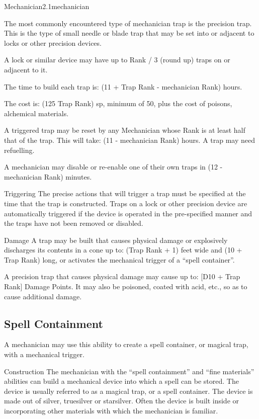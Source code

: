 \begin{skill}{Mechanician}{2.1}{mechanician}
\begin{Description}
The most commonly encountered type of mechanician trap is the
precision trap.  This is the type of small needle or blade trap that
may be set into or adjacent to locks or other precision devices.

A lock or similar device may have up to Rank / 3 (round up) traps on
or adjacent to it.

The time to build each trap is: (11 + Trap Rank - mechanician Rank)
hours.

The cost is: (125 \x Trap Rank) sp, minimum of 50, plus the cost of
poisons, alchemical materials.

A triggered trap may be reset by any Mechanician whose Rank is at
least half that of the trap. This will take: (11 - mechanician Rank)
hours. A trap may need refuelling.

A mechanician may disable or re-enable one of their own traps in (12 -
mechanician Rank) minutes.

\item[Triggering]
The precise actions that will trigger a trap must be specified at the
time that the trap is constructed.  Traps on a lock or other precision
device are automatically triggered if the device is operated in the
pre-specified manner and the traps have not been removed or disabled.

\item[Damage]
A trap may be built that causes physical damage or explosively
discharges its contents in a cone up to: (Trap Rank + 1) feet wide and
(10 + Trap Rank) long, or activates the mechanical trigger of a ``spell
container''.

A precision trap that causes physical damage may cause up to: [D10 +
Trap Rank] Damage Points. It may also be poisoned, coated with acid,
etc., so as to cause additional damage.

\end{Description}

\subsection{Spell Containment}
\label{mechanician:containment}


A mechanician may use this ability to create a spell container, or
magical trap, with a mechanical trigger.

\begin{Description}

\item[Construction]
The mechanician with the ``spell containment'' and ``fine materials''
abilities can build a mechanical device into which a spell can be
stored.  The device is usually referred to as a magical trap, or a
spell container.  The device is made out of silver, truesilver or
starsilver.  Often the device is built inside or incorporating other
materials with which the mechanician is familiar.


\end{Description}
\end{skill}
